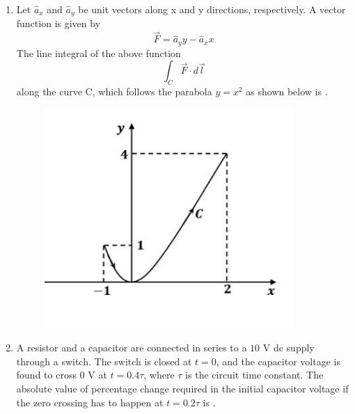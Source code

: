 \documentclass[journal,12pt,onecolumn]{IEEEtran}
\theoremstyle{remark}
\begin{document}
\begin{enumerate}[start=1, label=Q.\arabic*]
    \hfill{}

    \item Let $\hat{a}_x$ and $\hat{a}_y$ be unit vectors along x and y directions, respectively. A vector function is given by
    \[ \vec{F} = \hat{a}_y y - \hat{a}_x x \]
    The line integral of the above function
    \[ \int_C \vec{F} \cdot d\vec{l} \]
    along the curve C, which follows the parabola $y=x^2$ as shown below is \underline{\hspace{2cm}} .
    \begin{figure}[H]
        \centering
        \includegraphics[width=0.4\columnwidth]{Figures/qs54.png}
        \caption{}
    \end{figure}

    \hfill{}

    \item A resistor and a capacitor are connected in series to a $10$ V dc supply through a switch. The switch is closed at $t=0$, and the capacitor voltage is found to cross $0$ V at $t=0.4\tau$, where $\tau$ is the circuit time constant. The absolute value of percentage change required in the initial capacitor voltage if the zero crossing has to happen at $t=0.2\tau$ is \underline{\hspace{2cm}} .

    \hfill{}


\end{enumerate}
\end{document}

